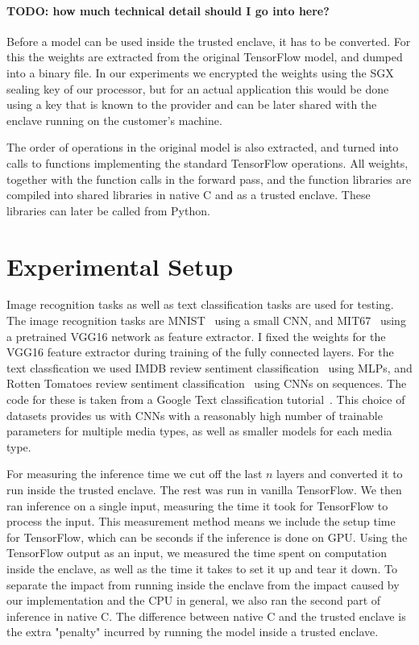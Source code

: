 \documentclass[11pt,twocolumn]{article}
\newcommand{\tf}{TensorFlow}
\begin{document}
\paragraph{TODO: how much technical detail should I go into here?}
Before a model can be used inside the trusted enclave, it has to be converted.
For this the weights are extracted from the original \tf{} model, and dumped into a binary file.
In our experiments we encrypted the weights using the SGX sealing key of our processor, but for an actual application this would be done using a key that is known to the provider and can be later shared with the enclave running on the customer's machine.

The order of operations in the original model is also extracted, and turned into calls to functions implementing the standard \tf{} operations.
All weights, together with the function calls in the forward pass, and the function libraries are compiled into shared libraries in native C and as a trusted enclave.
These libraries can later be called from Python.

\section{Experimental Setup}
\label{sec:setup}

Image recognition tasks as well as text classification tasks are used for testing.
The image recognition tasks are MNIST~\cite{noauthor_mnist_nodate} using a small CNN, and MIT67~\cite{quattoni_recognizing_nodate} using a pretrained VGG16 network as feature extractor.
I fixed the weights for the VGG16 feature extractor during training of the fully connected layers.
For the text classfication we used IMDB review sentiment classification~\cite{maas_learning_2011} using MLPs, and Rotten Tomatoes review sentiment classification~\cite{noauthor_sentiment_nodate} using CNNs on sequences.
The code for these is taken from a Google Text classification tutorial~\cite{noauthor_googleeng-edu_nodate}.
This choice of datasets provides us with CNNs with a reasonably high number of trainable parameters for multiple media types, as well as smaller models for each media type.

For measuring the inference time we cut off the last $n$ layers and converted it to run inside the trusted enclave.
The rest was run in vanilla \tf{}.
We then ran inference on a single input, measuring the time it took for \tf{} to process the input.
This measurement method means we include the setup time for \tf{}, which can be seconds if the inference is done on GPU.
Using the \tf{} output as an input, we measured the time spent on computation inside the enclave, as well as the time it takes to set it up and tear it down.
To separate the impact from running inside the enclave from the impact caused by our implementation and the CPU in general, we also ran the second part of inference in native C.
The difference between native C and the trusted enclave is the extra "penalty" incurred by running the model inside a trusted enclave.
\end{document}
